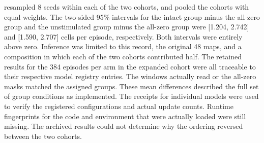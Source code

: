 \documentclass{article}
\begin{document}
resampled 8 seeds within each of the two cohorts, and pooled the cohorts with equal weights. The two-sided 95\% intervals for the intact group minus the all-zero group and the unstimulated group minus the all-zero group were [1.204, 2.742] and [1.590, 2.707] cells per episode, respectively. Both intervals were entirely above zero. Inference was limited to this record, the original 48 maps, and a composition in which each of the two cohorts contributed half. The retained results for the 384 episodes per arm in the expanded cohort were all traceable to their respective model registry entries. The windows actually read or the all-zero masks matched the assigned groups. These mean differences described the full set of group conditions as implemented. The receipts for individual models were used to verify the registered configurations and actual update counts. Runtime fingerprints for the code and environment that were actually loaded were still missing. The archived results could not determine why the ordering reversed between the two cohorts.
\end{document}
